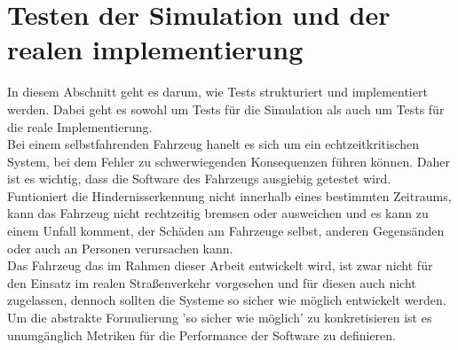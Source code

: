 \section{Testen der Simulation und der realen implementierung}
In diesem Abschnitt geht es darum, wie Tests strukturiert und implementiert werden. Dabei geht es sowohl um Tests für die Simulation als auch um Tests für die reale Implementierung. \\
Bei einem selbstfahrenden Fahrzeug hanelt es sich um ein echtzeitkritischen System, bei dem Fehler zu schwerwiegenden Konsequenzen führen können. Daher ist es wichtig, dass die Software des Fahrzeugs ausgiebig getestet wird. \\
Funtioniert die Hindernisserkennung nicht innerhalb eines bestimmten Zeitraums, kann das Fahrzeug nicht rechtzeitig bremsen oder ausweichen und es kann zu einem Unfall komment, 
der Schäden am Fahrzeuge selbst, anderen Gegensänden oder auch an Personen verursachen kann. \\
Das Fahrzeug das im Rahmen dieser Arbeit entwickelt wird, ist zwar nicht für den Einsatz im realen Straßenverkehr vorgesehen und für diesen auch nicht zugelassen,
dennoch sollten die Systeme so sicher wie möglich entwickelt werden. \\
Um die abstrakte Formulierung 'so sicher wie möglich' zu konkretisieren ist es unumgänglich Metriken für die Performance der Software zu definieren.
